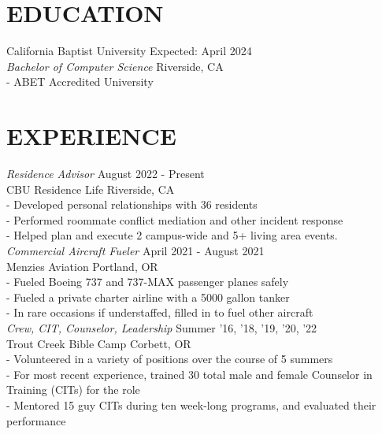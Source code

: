 \documentclass[line,margin]{res}
\begin{document}
\begin{resume}
\section{EDUCATION}
                    California Baptist University \hfill Expected: April 2024\\
                    {\sl Bachelor of Computer Science} \hfill Riverside, CA\\
                    - ABET Accredited University\\
                    
\section{EXPERIENCE}
                    {\sl Residence Advisor} \hfill August 2022 - Present\\
                    CBU Residence Life \hfill Riverside, CA\\
                    - Developed personal relationships with 36 residents\\
                    - Performed roommate conflict mediation and other incident response\\
                    - Helped plan and execute 2 campus-wide and 5+ living area events.\\

                    {\sl Commercial Aircraft Fueler} \hfill April 2021 - August 2021\\
                    Menzies Aviation \hfill Portland, OR\\
                    - Fueled Boeing 737 and 737-MAX passenger planes safely\\
                    - Fueled a private charter airline with a 5000 gallon tanker\\
                    - In rare occasions if understaffed, filled in to fuel other aircraft\\

                    {\sl Crew, CIT, Counselor, Leadership} \hfill Summer '16, '18, '19, '20, '22 \\
                    Trout Creek Bible Camp \hfill Corbett, OR\\
                    - Volunteered in a variety of positions over the course of 5 summers\\
                    - For most recent experience, trained 30 total male and female Counselor in Training (CITs) for the role\\
                    - Mentored 15 guy CITs during ten week-long programs, and evaluated their performance
                   
\end{resume}
\end{document}
